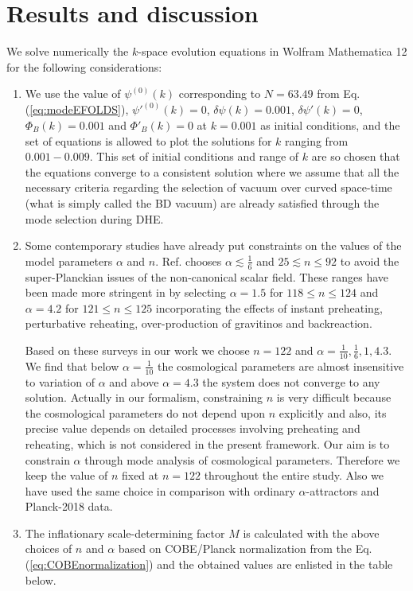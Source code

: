 \documentclass[a4paper,11pt]{article}
\begin{document}
\section{Results and discussion}
\label{sec: result}
We solve numerically the $k$-space evolution equations in Wolfram Mathematica 12 for the following considerations:
\begin{enumerate}
    \item We use the value of $\psi^{(0)}(k)$ corresponding to $N=63.49$ from Eq. (\ref{eq:modeEFOLDS}), $\psi'^{(0)}(k)=0$, $\delta\psi(k)=0.001$, $\delta\psi'(k)=0$, $\Phi_B(k)=0.001$ and $\Phi'_B(k)=0$ at $k=0.001$ as initial conditions, and the set of equations is allowed to plot the solutions for $k$ ranging from $0.001 - 0.009$. This set of initial conditions and range of $k$ are so chosen that the equations converge to a consistent solution where we assume that all the necessary criteria regarding the selection of vacuum over curved space-time (what is simply called the BD vacuum) are already satisfied through the mode selection during DHE.  
    \item Some contemporary studies have already put constraints on the values of the model parameters $\alpha$ and $n$. Ref. \cite{Dimopoulos:2017zvq} chooses $\alpha\lesssim \frac{1}{6}$ and $25\lesssim n\leq 92$ to avoid the super-Planckian  issues of the non-canonical scalar field. These ranges have been made more stringent in \cite{Dimopoulos:2017tud} by selecting $\alpha=1.5$ for $118\leq n\leq 124$ and $\alpha=4.2$ for $121\leq n\leq 125$ incorporating the effects of instant preheating, perturbative reheating, over-production of gravitinos and backreaction.\par Based on these surveys in our work we choose $n=122$ and $\alpha=\frac{1}{10}, \frac{1}{6}, 1, 4.3$. We find that below $\alpha=\frac{1}{10}$ the cosmological parameters are almost insensitive to variation of $\alpha$ and above $\alpha=4.3$ the system does not converge to any solution. Actually in our formalism, constraining $n$ is very difficult because the cosmological parameters do not depend upon $n$ explicitly and also, its precise value depends on detailed processes involving preheating and reheating, which is not considered in the present framework. Our aim is to constrain $\alpha$ through mode analysis of cosmological parameters. Therefore we keep the value of $n$ fixed at $n=122$ throughout the entire study. Also we have used the same choice in comparison with ordinary $\alpha$-attractors and Planck-2018 data.
    \item The inflationary scale-determining factor $M$ is calculated with the above choices of $n$ and $\alpha$ based on COBE/Planck normalization from the Eq. (\ref{eq:COBEnormalization}) and the obtained values are enlisted in the table below.

\end{enumerate}
\end{document}
